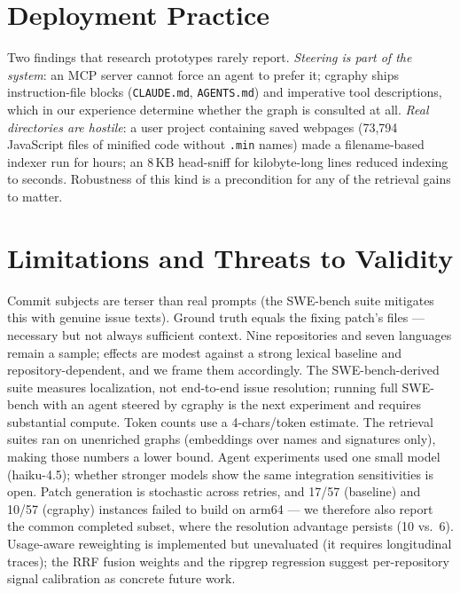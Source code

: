 \documentclass[11pt]{article}
\begin{document}
\section{Deployment Practice}\label{sec:practice}
Two findings that research prototypes rarely report. \emph{Steering is
part of the system}: an MCP server cannot force an agent to prefer it;
cgraphy ships instruction-file blocks (\texttt{CLAUDE.md},
\texttt{AGENTS.md}) and imperative tool descriptions, which in our
experience determine whether the graph is consulted at all.
\emph{Real directories are hostile}: a user project containing saved
webpages (73{,}794 JavaScript files of minified code without
\texttt{.min} names) made a filename-based indexer run for hours; an
8\,KB head-sniff for kilobyte-long lines reduced indexing to seconds.
Robustness of this kind is a precondition for any of the retrieval gains
to matter.

\section{Limitations and Threats to Validity}
Commit subjects are terser than real prompts (the SWE-bench suite
mitigates this with genuine issue texts). Ground truth equals the fixing
patch's files --- necessary but not always sufficient context. Nine
repositories and seven languages remain a sample; effects are modest
against a strong lexical baseline and repository-dependent, and we frame
them accordingly. The SWE-bench-derived suite measures localization, not
end-to-end issue resolution; running full SWE-bench with an agent steered
by cgraphy is the next experiment and requires substantial compute.
Token counts use a 4-chars/token estimate. The retrieval suites ran on
unenriched graphs (embeddings over names and signatures only), making
those numbers a lower bound. Agent experiments used one small model
(haiku-4.5); whether stronger models show the same integration
sensitivities is open. Patch generation is stochastic across retries, and
17/57 (baseline) and 10/57 (cgraphy) instances failed to build on arm64
--- we therefore also report the common completed subset, where the
resolution advantage persists (10 vs.\ 6). Usage-aware reweighting is
implemented but unevaluated (it requires longitudinal traces); the RRF
fusion weights and the ripgrep regression suggest per-repository signal
calibration as concrete future work.
\end{document}
